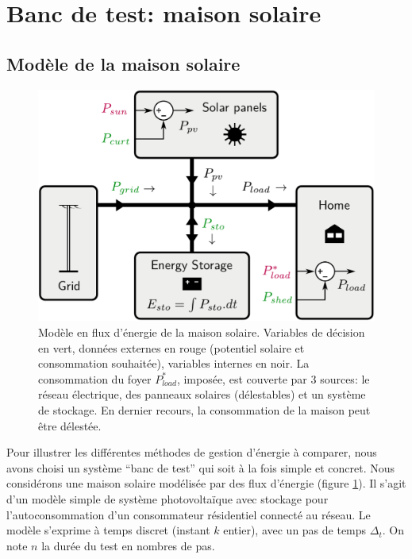 \documentclass[a4paper,10pt,twocolumn]{article}
\begin{document}
\section{Banc de test: maison solaire}

\subsection{Modèle de la maison solaire}
\label{ss:model}

\begin{figure}[!ht]
        \begin{center}
                \includegraphics[width=0.9\columnwidth]{figures/solar_home.pdf}
        \end{center}

        \caption{Modèle en flux d'énergie de la maison solaire.
        Variables de décision en vert, données externes en rouge (potentiel solaire et consommation souhaitée), variables internes en noir.
        La consommation du foyer $P_{load}^*$, imposée, est couverte par 3 sources:
        le réseau électrique, des panneaux solaires (délestables)
        et un système de stockage.
        En dernier recours, la consommation de la maison peut être délestée.
        }
        \label{fig:solhome}
\end{figure}

Pour illustrer les différentes méthodes de gestion d'énergie à comparer,
nous avons choisi un système ``banc de test'' qui soit à la fois simple et concret.
Nous considérons une maison solaire modélisée par
des flux d'énergie (figure \ref{fig:solhome}).
Il s'agit d'un modèle simple de système photovoltaïque avec stockage
pour l'autoconsommation d'un consommateur résidentiel connecté au réseau.
Le modèle s'exprime à temps discret (instant $k$ entier),
avec un pas de temps $\Delta_t$. On note $n$ la durée du test
en nombres de pas.
\end{document}
